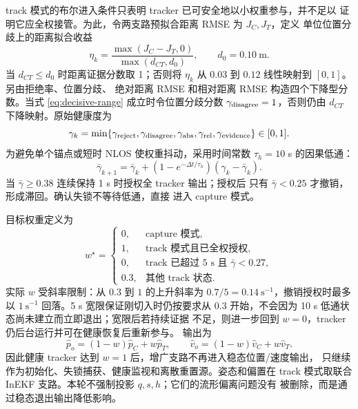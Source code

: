 \documentclass[11pt,a4paper]{ctexart}
\begin{document}
track 模式的布尔进入条件只表明 tracker 已可安全地以小权重参与，并不足以
证明它应全权接管。为此，令两支路预拟合距离 RMSE 为 $J_C,J_T$，定义
单位位置分歧上的距离拟合收益
\begin{equation}
\eta_k=
\frac{\max(J_C-J_T,0)}
{\max(d_{CT},d_0)},\qquad d_0=0.10~\mathrm{m}.
\end{equation}
当 $d_{CT}\le d_0$ 时距离证据分数取 1；否则将 $\eta_k$ 从
$0.03$ 到 $0.12$ 线性映射到 $[0,1]$。另由拒绝率、位置分歧、
绝对距离 RMSE 和相对距离 RMSE 构造四个下降型分数。当式
\eqref{eq:decisive-range} 成立时令位置分歧分数
$\gamma_{\rm disagree}=1$，否则仍由 $d_{CT}$ 下降映射。原始健康度为
\begin{equation}
\gamma_k=\min\{\gamma_{\rm reject},\gamma_{\rm disagree},
\gamma_{\rm abs},\gamma_{\rm rel},\gamma_{\rm evidence}\}\in[0,1].
\end{equation}
为避免单个锚点或短时 NLOS 使权重抖动，采用时间常数
$\tau_h=10$ s 的因果低通：
\begin{equation}
\bar\gamma_{k+1}=\bar\gamma_k+
\left(1-e^{-\Delta t/\tau_h}\right)(\gamma_k-\bar\gamma_k).
\end{equation}
当 $\bar\gamma\ge0.38$ 连续保持 1 s 时授权全 tracker 输出；授权后
只有 $\bar\gamma<0.25$ 才撤销，形成滞回。确认失锁不等待低通，直接
进入 capture 模式。

目标权重定义为
\begin{equation}
w^\star=
\begin{cases}
0,&\text{capture 模式},\\
1,&\text{track 模式且已全权授权},\\
0,&\text{track 已超过 5 s 且 }\bar\gamma<0.27,\\
0.3,&\text{其他 track 状态}.
\end{cases}
\end{equation}
实际 $w$ 受斜率限制：从 $0.3$ 到 $1$ 的上升斜率为
$0.7/5=0.14~\mathrm{s}^{-1}$，撤销授权时最多以
$1~\mathrm{s}^{-1}$ 回落。5 s 宽限保证刚切入时仍按要求从 $0.3$
开始，不会因为 10 s 低通状态尚未建立而立即退出；宽限后若持续证据
不足，则进一步回到 $w=0$，tracker 仍后台运行并可在健康恢复后重新参与。
输出为
\begin{equation}
\boxed{
\hat p_o=(1-w)\hat p_C+w\hat p_T,\qquad
\hat v_o=(1-w)\hat v_C+w\hat v_T .}
\end{equation}
因此健康 tracker 达到 $w=1$ 后，增广支路不再进入稳态位置/速度输出，
只继续作为初始化、失锁捕获、健康监视和离散重置源。姿态和偏置在 track
模式取联合 InEKF 支路。本轮不强制投影 $q,s,h$；它们的流形偏离问题没有
被删除，而是通过稳态退出输出降低影响。
\end{document}
